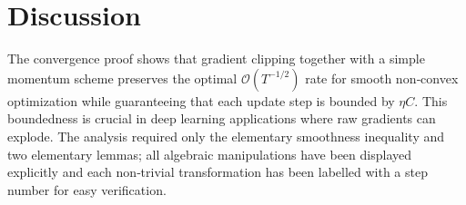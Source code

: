 \documentclass{article}
\begin{document}
\section*{Discussion}
The convergence proof shows that gradient clipping together with a simple momentum scheme preserves the optimal $\mathcal{O}(T^{-1/2})$ rate for smooth non‑convex optimization while guaranteeing that each update step is bounded by $\eta C$. This boundedness is crucial in deep learning applications where raw gradients can explode. The analysis required only the elementary smoothness inequality and two elementary lemmas; all algebraic manipulations have been displayed explicitly and each non‑trivial transformation has been labelled with a step number for easy verification.
\end{document}
